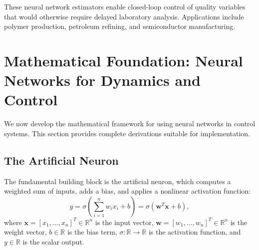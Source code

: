 These neural network estimators enable closed-loop control of quality variables that would otherwise require delayed laboratory analysis. Applications include polymer production, petroleum refining, and semiconductor manufacturing.


\section{Mathematical Foundation: Neural Networks for Dynamics and Control}

We now develop the mathematical framework for using neural networks in control systems. This section provides complete derivations suitable for implementation.

\subsection{The Artificial Neuron}

The fundamental building block is the artificial neuron, which computes a weighted sum of inputs, adds a bias, and applies a nonlinear activation function:
\begin{equation}
y = \sigma\left(\sum_{i=1}^{n} w_i x_i + b\right) = \sigma(\mathbf{w}^T\mathbf{x} + b),
\label{eq:neuron}
\end{equation}
where $\mathbf{x} = [x_1, \ldots, x_n]^T \in \mathbb{R}^n$ is the input vector, $\mathbf{w} = [w_1, \ldots, w_n]^T \in \mathbb{R}^n$ is the weight vector, $b \in \mathbb{R}$ is the bias term, $\sigma: \mathbb{R} \to \mathbb{R}$ is the activation function, and $y \in \mathbb{R}$ is the scalar output.

